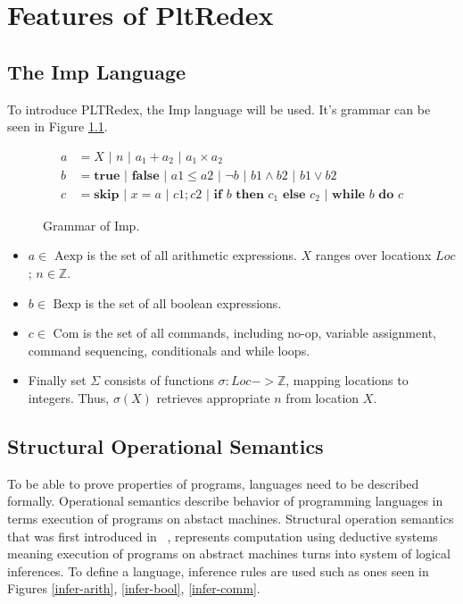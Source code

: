 \chapter{Features of PltRedex}

\section{The Imp Language}

To introduce PLTRedex, the Imp language will be used. It's grammar can be seen in Figure \ref{imp-grammar}.

\begin{figure}[H]
\begin{align*}
a &= X \text{ | } n \text{ | } a_1 + a_2 \text{ | } a_1 \times a_2 \\
b &= \textbf{true} \text{ | } \textbf{false} \text{ | } a1 \leq a2 \text{ | } \neg b \text{ | } b1 \land b2 \text{ | } b1 \lor b2 \\
c &= \textbf{skip} \text{ | } x = a \text{ | } c1; c2 \text{ | } \textbf{if } b \textbf{ then } c_1 \textbf{ else } c_2 \text{ | } \textbf{while } b \textbf{ do } c
\end{align*}
\caption{Grammar of Imp.}
\label{imp-grammar}
\end{figure}

\begin{itemize}
\item $a \in \text{ Aexp}$ is the set of all arithmetic expressions. $X$ ranges over locationx $Loc$; $n \in \mathbb{Z}$.
\item $b \in \text{ Bexp}$ is the set of all boolean expressions.
\item $c \in \text{ Com}$ is the set of all commands, including no-op, variable assignment, command sequencing, conditionals and while loops.
\item Finally set $\Sigma$ consists of functions $\sigma: Loc -> \mathbb{Z}$, mapping locations to integers. Thus, $\sigma(X)$ retrieves appropriate $n$ from location $X$.
\end{itemize}


\section{Structural Operational Semantics}
To be able to prove properties of programs, languages need to be described formally. Operational semantics describe behavior of programming languages in terms execution of programs on abstact machines. Structural operation semantics that was first introduced in ~\cite{plotkin}, represents computation using deductive systems meaning execution of programs on abstract machines turns into system of logical inferences. To define a language, inference rules are used such as ones seen in Figures \ref{infer-arith}, \ref{infer-bool}, \ref{infer-comm}.

